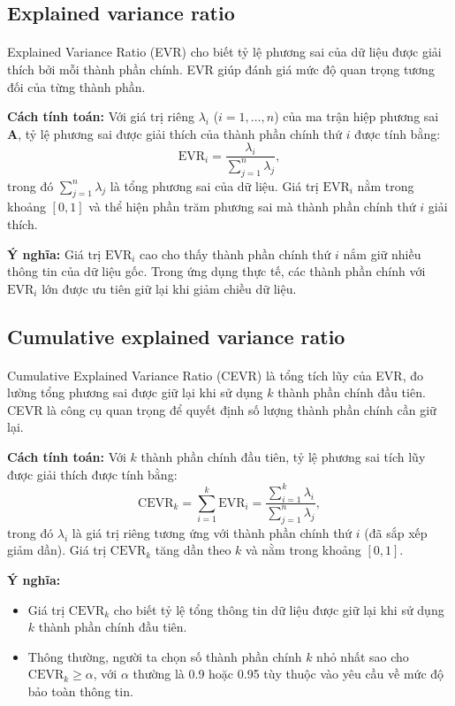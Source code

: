 \subsection{Explained variance ratio}

\paragraph{}{Explained Variance Ratio (EVR) cho biết tỷ lệ phương sai của dữ liệu được giải thích bởi mỗi thành phần chính. EVR giúp đánh giá mức độ quan trọng tương đối của từng thành phần.}

\textbf{Cách tính toán:} Với giá trị riêng $\lambda_i$ ($i = 1, \dots, n$) của ma trận hiệp phương sai $\mathbf{A}$, tỷ lệ phương sai được giải thích của thành phần chính thứ $i$ được tính bằng:
\[
\text{EVR}_i = \frac{\lambda_i}{\sum_{j=1}^n \lambda_j},
\]
trong đó $\sum_{j=1}^n \lambda_j$ là tổng phương sai của dữ liệu. Giá trị $\text{EVR}_i$ nằm trong khoảng $[0, 1]$ và thể hiện phần trăm phương sai mà thành phần chính thứ $i$ giải thích.

\textbf{Ý nghĩa:} Giá trị $\text{EVR}_i$ cao cho thấy thành phần chính thứ $i$ nắm giữ nhiều thông tin của dữ liệu gốc. Trong ứng dụng thực tế, các thành phần chính với $\text{EVR}_i$ lớn được ưu tiên giữ lại khi giảm chiều dữ liệu.

\subsection{Cumulative explained variance ratio}

\paragraph{}{Cumulative Explained Variance Ratio (CEVR) là tổng tích lũy của EVR, đo lường tổng phương sai được giữ lại khi sử dụng $k$ thành phần chính đầu tiên. CEVR là công cụ quan trọng để quyết định số lượng thành phần chính cần giữ lại.}

\textbf{Cách tính toán:} Với $k$ thành phần chính đầu tiên, tỷ lệ phương sai tích lũy được giải thích được tính bằng:
\[
\text{CEVR}_k = \sum_{i=1}^k \text{EVR}_i = \frac{\sum_{i=1}^k \lambda_i}{\sum_{j=1}^n \lambda_j},
\]
trong đó $\lambda_i$ là giá trị riêng tương ứng với thành phần chính thứ $i$ (đã sắp xếp giảm dần). Giá trị $\text{CEVR}_k$ tăng dần theo $k$ và nằm trong khoảng $[0, 1]$.

\textbf{Ý nghĩa:} 
\begin{itemize}
  \item Giá trị $\text{CEVR}_k$ cho biết tỷ lệ tổng thông tin dữ liệu được giữ lại khi sử dụng $k$ thành phần chính đầu tiên.
  \item Thông thường, người ta chọn số thành phần chính $k$ nhỏ nhất sao cho $\text{CEVR}_k \geq \alpha$, với $\alpha$ thường là 0.9 hoặc 0.95 tùy thuộc vào yêu cầu về mức độ bảo toàn thông tin.
\end{itemize}

\pagebreak